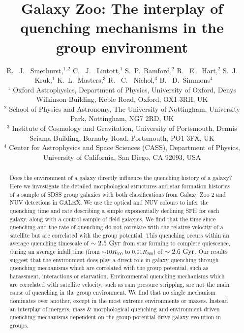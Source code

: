 \documentclass[useAMS,usenatbib]{mn2e}
\begin{document}
\title[Quenching in the group environment]{Galaxy Zoo: The interplay of quenching mechanisms in the group environment}
\author[Smethurst et al. 2017]{R. ~J. ~Smethurst,$^{1,2}$ C. ~J. ~Lintott,$^{1}$ S.~P.~Bamford,$^{2}$ R. ~E. ~Hart,$^{2}$ \newauthor S.~J. ~Kruk,$^{1}$ K.~L.~Masters,$^{3}$  R. ~C. ~Nichol,$^{3}$ B. ~D.~Simmons$^{4}$ \footnotemark[1]
\\ $^1$ Oxford Astrophysics, Department of Physics, University of Oxford, Denys Wilkinson Building, Keble Road, Oxford, OX1 3RH, UK 
\\ $^2$ School of Physics and Astronomy, The University of Nottingham, University Park, Nottingham, NG7 2RD, UK
\\ $^3$ Institute of Cosmology and Gravitation, University of Portsmouth, Dennis Sciama Building, Barnaby Road, Portsmouth, PO1 3FX, UK 
\\ $^4$ Center for Astrophysics and Space Sciences (CASS), Department of Physics, University of California, San Diego, CA 92093, USA
}

\maketitle

\begin{abstract}
Does the environment of a galaxy directly influence the quenching history of a galaxy? Here we investigate the detailed morphological structures and star formation histories of a sample of SDSS group galaxies with both classifications from Galaxy Zoo 2 and NUV detections in GALEX. We use the optical and NUV colours to infer the quenching time and rate describing a simple exponentially declining SFH for each galaxy, along with a control sample of field galaxies. We find that the time since quenching and the rate of quenching do not correlate with the relative velocity of a satellite but are correlated with the group potential. This quenching occurs within an average quenching timescale of $\sim2.5~\rm{Gyr}$ from star forming to complete quiescence, during an average infall time (from $\sim 10R_{200}$ to $0.01R_{200}$) of $\sim 2.6~\rm{Gyr}$. Our results suggest that the environment does play a direct role in galaxy quenching through quenching mechanisms which are correlated with the group potential, such as harassment, interactions or starvation. Environmental quenching mechanisms which are correlated with satellite velocity, such as ram pressure stripping, are not the main cause of quenching in the group environment. We find that no single mechanism dominates over another, except in the most extreme environments or masses. Instead an interplay of mergers, mass \& morphological quenching and environment driven quenching mechanisms dependent on the group potential drive galaxy evolution in groups. 

\end{abstract}
\end{document}
